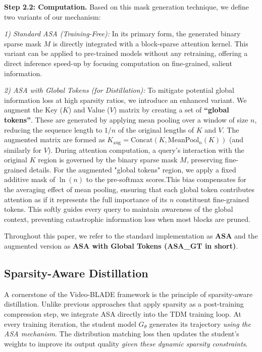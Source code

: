 \documentclass[letterpaper]{article} %
\begin{document}
\textbf{Step 2.2: Computation. }
Based on this mask generation technique, we define two variants of our mechanism:

\textit{1) Standard ASA (Training-Free):} In its primary form, the generated binary sparse mask $M$ is directly integrated with a block-sparse attention kernel. This variant can be applied to pre-trained models without any retraining, offering a direct inference speed-up by focusing computation on fine-grained, salient information.

\textit{2) ASA with Global Tokens (for Distillation):} To mitigate potential global information loss at high sparsity ratios, we introduce an enhanced variant. We augment the Key ($K$) and Value ($V$) matrix by creating a set of  \textbf{``global tokens''}.  These are generated by applying mean pooling over a window of size $n$, reducing the sequence length to $1/n$ of the original lengths of $K$ and $V$. The augmented matrix are formed as $K_{\text{aug}} = \text{Concat}(K, \text{MeanPool}_n(K))$ (and similarly for $V$). During attention computation, a query's interaction with the original $K$ region is governed by the binary sparse mask $M$, preserving fine-grained details. For the augmented "global tokens" region, we apply a fixed additive mask of $\ln(n)$ to the pre-softmax scores.This bias compensates for the averaging effect of mean pooling, ensuring that each global token contributes attention as if it represents the full importance of its $n$ constituent fine-grained tokens. This softly guides every query to maintain awareness of the global context, preventing catastrophic information loss when most blocks are pruned.

Throughout this paper, we refer to the standard implementation as \textbf{ASA} and the augmented version as \textbf{ASA with Global Tokens (ASA\_GT in short)}.

\subsection{Sparsity-Aware Distillation}
A cornerstone of the Video-BLADE framework is the principle of sparsity-aware distillation. Unlike previous approaches that apply sparsity as a post-training compression step, we integrate ASA directly into the TDM training loop. At every training iteration, the student model $G_{\theta}$ generates its trajectory \textit{using the ASA mechanism}. The distribution matching loss then updates the student's weights to improve its output quality \textit{given these dynamic sparsity constraints}.
\end{document}
